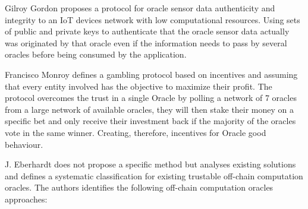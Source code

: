 Gilroy Gordon \cite{Gordon2017ProvenanceSensorsb} proposes a protocol for oracle sensor data authenticity and integrity to an IoT devices network with low computational resources. Using sets of public and private keys to authenticate that the oracle sensor data actually was originated by that oracle even if the information needs to pass by several oracles before being consumed by the application.

Francisco Monroy \cite{MontotoMonroy2018BitcoinBlockchain} defines a gambling protocol based on incentives and assuming that every entity involved has the objective to maximize their profit. The protocol overcomes the trust in a single Oracle by polling a network of 7 oracles from a large network of available oracles, they will then stake their money on a specific bet and only receive their investment back if the majority of the oracles vote in the same winner. Creating, therefore, incentives for Oracle good behaviour.

J. Eberhardt \cite{Eberhardt2018Off-chainingComputations} does not propose a specific method but analyses existing solutions and defines a systematic classification for existing trustable off-chain computation oracles. The authors identifies the following off-chain computation oracles approaches:

